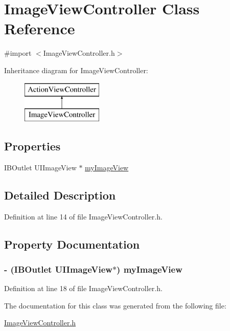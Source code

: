 \hypertarget{interface_image_view_controller}{
\section{ImageViewController Class Reference}
\label{interface_image_view_controller}
}


{\ttfamily \#import $<$ImageViewController.h$>$}

Inheritance diagram for ImageViewController:\begin{figure}[H]
\begin{center}
\leavevmode
\includegraphics[height=2.000000cm]{interface_image_view_controller}
\end{center}
\end{figure}
\subsection*{Properties}
\begin{DoxyCompactItemize}
\item 
IBOutlet UIImageView $\ast$ \hyperlink{interface_image_view_controller_ac5b740a1f98d442ea89d96b69ffc9ebf}{myImageView}
\end{DoxyCompactItemize}


\subsection{Detailed Description}


Definition at line 14 of file ImageViewController.h.



\subsection{Property Documentation}
\hypertarget{interface_image_view_controller_ac5b740a1f98d442ea89d96b69ffc9ebf}{
\subsubsection[{myImageView}]{\setlength{\rightskip}{0pt plus 5cm}-\/ (IBOutlet UIImageView$\ast$) myImageView}}
\label{interface_image_view_controller_ac5b740a1f98d442ea89d96b69ffc9ebf}


Definition at line 18 of file ImageViewController.h.



The documentation for this class was generated from the following file:\begin{DoxyCompactItemize}
\item 
\hyperlink{_image_view_controller_8h}{ImageViewController.h}\end{DoxyCompactItemize}
